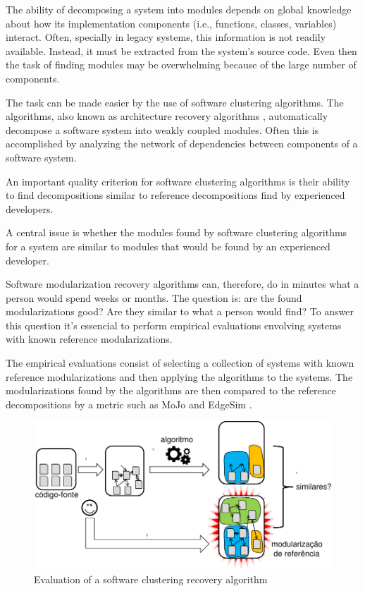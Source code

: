 The ability of decomposing a system into modules depends on global knowledge
about how its implementation components (i.e., functions, classes, variables)
interact. Often, specially in legacy systems, this information is not readily
available. Instead, it must be extracted from the system's source code. Even
then the task of finding modules may be overwhelming because of the large number
of components.

The task can be made easier by the use of software clustering algorithms. The
algorithms, also known as architecture recovery algorithms \cite{Pollet2007},
automatically decompose a software system into weakly coupled modules. Often
this is accomplished by analyzing the network of dependencies between components
of a software system.


An important quality criterion for software clustering algorithms is their
ability to find decompositions similar to reference decompositions find by
experienced developers. 


A central issue is whether the modules found by software clustering algorithms
for a system are similar to modules that would be found by an experienced
developer. 

Software modularization recovery algorithms can, therefore, do in minutes what a
person would spend weeks or months. The question is: are the found
modularizations good? Are they similar to what a person would find? To answer
this question it's essencial to perform empirical evaluations envolving systems
with known reference modularizations.

The empirical evaluations consist of selecting a collection of systems with
known reference modularizations and then applying the algorithms to the systems.
The modularizations found by the algorithms are then compared to the reference
decompositions by a metric such as MoJo \cite{Tzerpos1999} and EdgeSim
\cite{Mitchell2001}.

  \begin{figure}[!t]
  \centering
  \includegraphics[width=1.0\textwidth]{diagram}
  \caption{Evaluation of a software clustering recovery algorithm}
  \label{fig:diagram}
  \end{figure}

